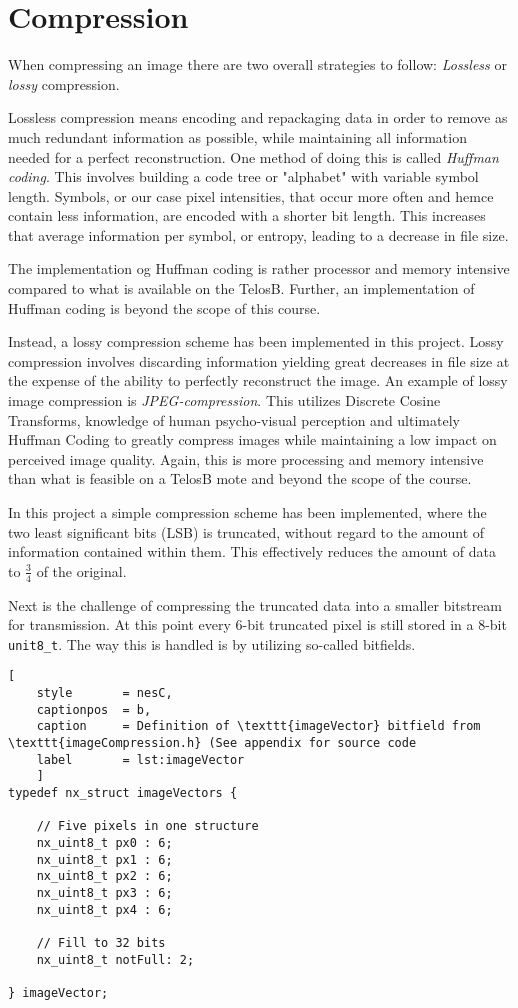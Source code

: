 \section{Compression}
When compressing an image there are two overall strategies to follow:
\emph{Lossless} or \emph{lossy} compression.

Lossless compression means encoding and repackaging data in order to remove as much redundant information as possible, while maintaining all information needed for a perfect reconstruction. 
One method of doing this is called \emph{Huffman coding}.
This involves building a code tree or "alphabet" with variable symbol length.
Symbols, or our case pixel intensities, that occur more often and hemce contain less information, are encoded with a shorter bit length. 
This increases that average information per symbol, or entropy, leading to a decrease in file size.

The implementation og Huffman coding is rather processor and memory intensive compared to what is available on the TelosB.
Further, an implementation of Huffman coding is beyond the scope of this course.

Instead, a lossy compression scheme has been implemented in this project.
Lossy compression involves discarding information yielding great decreases in file size at the expense of the ability to perfectly reconstruct the image.
An example of lossy image compression is \emph{JPEG-compression}.
This utilizes Discrete Cosine Transforms, knowledge of human psycho-visual perception and ultimately Huffman Coding to greatly compress images while maintaining a low impact on perceived image quality.
Again, this is more processing and memory intensive than what is feasible on a TelosB mote and beyond the scope of the course.

In this project a simple compression scheme has been implemented, where the two least significant  bits (LSB) is truncated, without regard to the amount of information contained within them.
This effectively reduces the amount of data to $ \frac{3}{4} $ of the original. 

Next is the challenge of compressing the truncated data into a smaller bitstream for transmission.
At this point every 6-bit truncated pixel is still stored in a 8-bit \texttt{unit8\_t}.
The way this is handled is by utilizing so-called bitfields.

\begin{lstlisting}[
	style		= nesC, 
	captionpos	= b, 
	caption		= Definition of \texttt{imageVector} bitfield from \texttt{imageCompression.h} (See appendix for source code
	label		= lst:imageVector
	]
typedef nx_struct imageVectors {
	
	// Five pixels in one structure
	nx_uint8_t px0 : 6;
	nx_uint8_t px1 : 6;
	nx_uint8_t px2 : 6;
	nx_uint8_t px3 : 6;
	nx_uint8_t px4 : 6;
	
	// Fill to 32 bits
	nx_uint8_t notFull: 2;
	
} imageVector;

\end{lstlisting}

